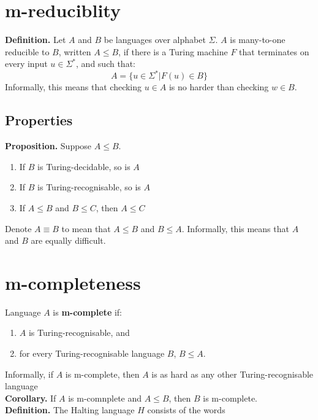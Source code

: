 \documentclass{article}
\begin{document}
\section{m-reduciblity}
\textbf{Definition.} Let $A$ and $B$ be languages over alphabet $\Sigma$. $A$ is many-to-one reducible to $B$, written $A \leq B$, if there is a Turing machine $F$ that terminates on every input $u \in \Sigma^*$, and such that:
$$ A = \{u \in \Sigma^* | F(u) \in B\}$$
Informally, this means that checking $u \in A$ is no harder than checking $w \in B$.

\subsection{Properties}
\textbf{Proposition.} Suppose $A \leq B$.
\begin{enumerate}
	\item If $B$ is Turing-decidable, so is $A$
	\item If $B$ is Turing-recognisable, so is $A$
	\item If $A \leq B$ and $B \leq C$, then $A \leq C$
\end{enumerate}
Denote $A \equiv B$ to mean that $A \leq B$ and $B \leq A$. Informally, this means that $A$ and $B$ are equally difficult.

\section{m-completeness}
Language $A$ is \textbf{m-complete} if:
\begin{enumerate}
	\item $A$ is Turing-recognisable, and
	\item for every Turing-recognisable language $B$, $B \leq A$.
\end{enumerate}
Informally, if $A$ is m-complete, then $A$ is as hard as any other Turing-recognisable language\medskip
\\\textbf{Corollary.} If $A$ is m-comnplete and $A \leq B$, then $B$ is m-complete.\medskip
\\\textbf{Definition.} The Halting language $H$ consists of the words
\end{document}
